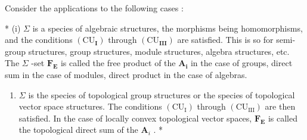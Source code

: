 Consider the applications to the following cases :

* (i) \(\Sigma\) is a species of algebraic structures, the morphisms being homomorphisms, and the conditions \((\mathrm{CU}_{\mathbf{I}})\) through \((\mathrm{CU}_{\mathbf{III}})\) are satisfied. This is so for semi-group structures, group structures, module structures, algebra structures, etc. The \(\Sigma\) -set \(\mathbf{F}_{\mathbf{E}}\) is called the free product of the \(\mathbf{A}_{\mathbf{i}}\) in the case of groups, direct sum in the case of modules, direct product in the case of algebras.

\begin{enumerate}
\def\labelenumi{(\roman{enumi})}
\setcounter{enumi}{1}
\tightlist
\item
  \(\Sigma\) is the species of topological group structures or the species of topological vector space structures. The conditions \((\mathrm{CU}_{\mathrm{I}})\) through \((\mathrm{CU}_{\mathrm{III}})\) are then satisfied. In the case of locally convex topological vector spaces, \(\mathbf{F}_{\mathbf{E}}\) is called the topological direct sum of the \(\mathbf{A}_{i}\) . *
\end{enumerate}
